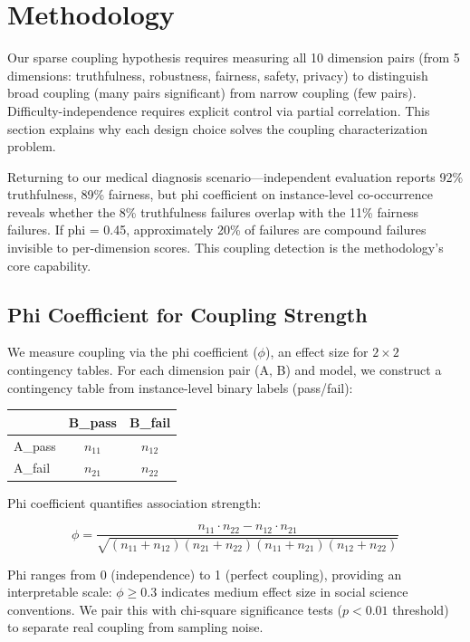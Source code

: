 \section{Methodology}

Our sparse coupling hypothesis requires measuring all 10 dimension pairs (from 5 dimensions: truthfulness, robustness, fairness, safety, privacy) to distinguish broad coupling (many pairs significant) from narrow coupling (few pairs). Difficulty-independence requires explicit control via partial correlation. This section explains why each design choice solves the coupling characterization problem.

Returning to our medical diagnosis scenario---independent evaluation reports 92\% truthfulness, 89\% fairness, but phi coefficient on instance-level co-occurrence reveals whether the 8\% truthfulness failures overlap with the 11\% fairness failures. If phi = 0.45, approximately 20\% of failures are compound failures invisible to per-dimension scores. This coupling detection is the methodology's core capability.

\subsection{Phi Coefficient for Coupling Strength}

We measure coupling via the phi coefficient ($\phi$), an effect size for $2\times2$ contingency tables. For each dimension pair (A, B) and model, we construct a contingency table from instance-level binary labels (pass/fail):

\begin{table}[h]
\centering
\begin{tabular}{l|cc}
 & B\_pass & B\_fail \\
\hline
A\_pass & $n_{11}$ & $n_{12}$ \\
A\_fail & $n_{21}$ & $n_{22}$ \\
\end{tabular}
\end{table}

Phi coefficient quantifies association strength:

\[
\phi = \frac{n_{11} \cdot n_{22} - n_{12} \cdot n_{21}}{\sqrt{(n_{11}+n_{12})(n_{21}+n_{22})(n_{11}+n_{21})(n_{12}+n_{22})}}
\]

Phi ranges from 0 (independence) to 1 (perfect coupling), providing an interpretable scale: $\phi \geq 0.3$ indicates medium effect size in social science conventions. We pair this with chi-square significance tests ($p < 0.01$ threshold) to separate real coupling from sampling noise.

